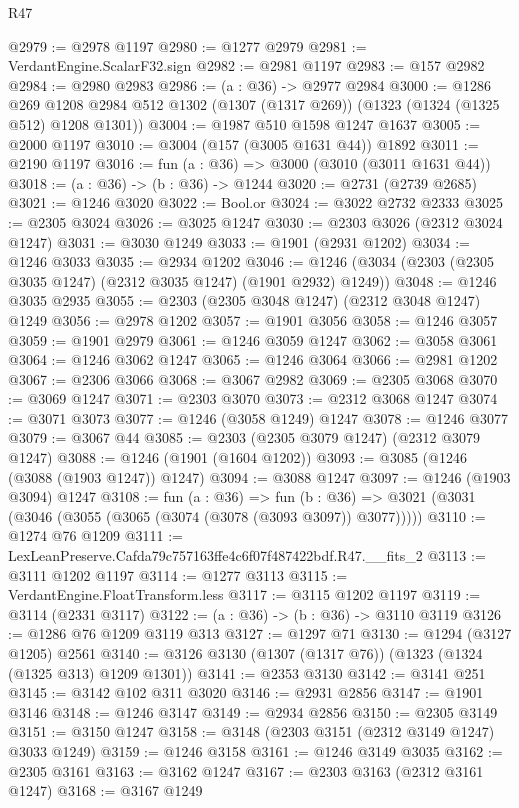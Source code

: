 \begin{lexlean}{R47}
\begin{coremodule}
@2979 := @2978 @1197
@2980 := @1277 @2979
@2981 := VerdantEngine.ScalarF32.sign
@2982 := @2981 @1197
@2983 := @157 @2982
@2984 := @2980 @2983
@2986 := (a : @36) -> @2977 @2984
@3000 := @1286
    @269
    @1208
    @2984
    @512
    @1302
    (@1307 (@1317 @269))
    (@1323 (@1324 (@1325 @512) @1208 @1301))
@3004 := @1987 @510 @1598 @1247 @1637
@3005 := @2000 @1197
@3010 := @3004 (@157 (@3005 @1631 @44)) @1892
@3011 := @2190 @1197
@3016 := fun (a : @36) => @3000 (@3010 (@3011 @1631 @44))
@3018 := (a : @36) -> (b : @36) -> @1244
@3020 := @2731 (@2739 @2685)
@3021 := @1246 @3020
@3022 := Bool.or
@3024 := @3022 @2732 @2333
@3025 := @2305 @3024
@3026 := @3025 @1247
@3030 := @2303 @3026 (@2312 @3024 @1247)
@3031 := @3030 @1249
@3033 := @1901 (@2931 @1202)
@3034 := @1246 @3033
@3035 := @2934 @1202
@3046 := @1246 (@3034 (@2303 (@2305 @3035 @1247) (@2312 @3035 @1247) (@1901 @2932) @1249))
@3048 := @1246 @3035 @2935
@3055 := @2303 (@2305 @3048 @1247) (@2312 @3048 @1247) @1249
@3056 := @2978 @1202
@3057 := @1901 @3056
@3058 := @1246 @3057
@3059 := @1901 @2979
@3061 := @1246 @3059 @1247
@3062 := @3058 @3061
@3064 := @1246 @3062 @1247
@3065 := @1246 @3064
@3066 := @2981 @1202
@3067 := @2306 @3066
@3068 := @3067 @2982
@3069 := @2305 @3068
@3070 := @3069 @1247
@3071 := @2303 @3070
@3073 := @2312 @3068 @1247
@3074 := @3071 @3073
@3077 := @1246 (@3058 @1249) @1247
@3078 := @1246 @3077
@3079 := @3067 @44
@3085 := @2303 (@2305 @3079 @1247) (@2312 @3079 @1247)
@3088 := @1246 (@1901 (@1604 @1202))
@3093 := @3085 (@1246 (@3088 (@1903 @1247)) @1247)
@3094 := @3088 @1247
@3097 := @1246 (@1903 @3094) @1247
@3108 := fun (a : @36) =>
  fun (b : @36) => @3021 (@3031 (@3046 (@3055 (@3065 (@3074 (@3078 (@3093 @3097)) @3077)))))
@3110 := @1274 @76 @1209
@3111 := LexLeanPreserve.Cafda79c757163ffe4c6f07f487422bdf.R47.__fits_2
@3113 := @3111 @1202 @1197
@3114 := @1277 @3113
@3115 := VerdantEngine.FloatTransform.less
@3117 := @3115 @1202 @1197
@3119 := @3114 (@2331 @3117)
@3122 := (a : @36) -> (b : @36) -> @3110 @3119
@3126 := @1286 @76 @1209 @3119 @313
@3127 := @1297 @71
@3130 := @1294 (@3127 @1205) @2561
@3140 := @3126 @3130 (@1307 (@1317 @76)) (@1323 (@1324 (@1325 @313) @1209 @1301))
@3141 := @2353 @3130
@3142 := @3141 @251
@3145 := @3142 @102 @311 @3020
@3146 := @2931 @2856
@3147 := @1901 @3146
@3148 := @1246 @3147
@3149 := @2934 @2856
@3150 := @2305 @3149
@3151 := @3150 @1247
@3158 := @3148 (@2303 @3151 (@2312 @3149 @1247) @3033 @1249)
@3159 := @1246 @3158
@3161 := @1246 @3149 @3035
@3162 := @2305 @3161
@3163 := @3162 @1247
@3167 := @2303 @3163 (@2312 @3161 @1247)
@3168 := @3167 @1249

\end{coremodule}
\end{lexlean}
